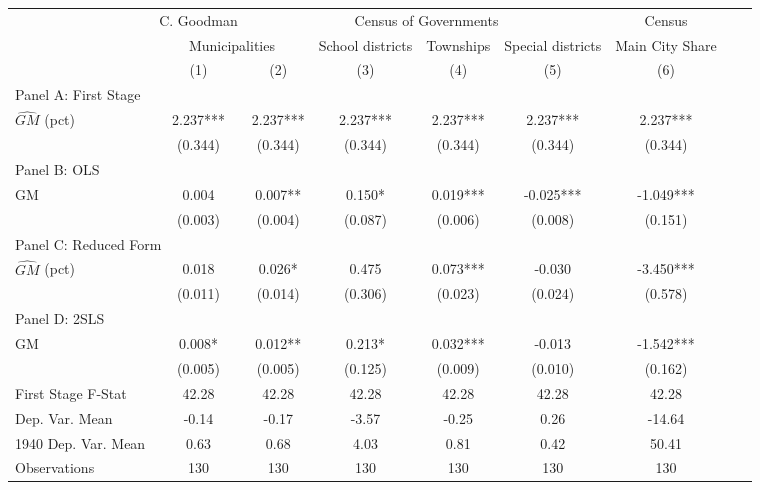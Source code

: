  \begin{tabular}{l*{8}{c}} \toprule
&\multicolumn{1}{c}{C. Goodman}&\multicolumn{4}{c}{Census of Governments}&\multicolumn{1}{c}{Census}\\\cmidrule(lr){2-2}\cmidrule(lr){3-6}\cmidrule(lr){7-7}
&\multicolumn{2}{c}{Municipalities}&\multicolumn{1}{c}{School districts}&\multicolumn{1}{c}{Townships}&\multicolumn{1}{c}{Special districts}&\multicolumn{1}{c}{Main City Share}\\\cmidrule(lr){2-3}\cmidrule(lr){4-6}\cmidrule(lr){7-7}
&\multicolumn{1}{c}{(1)}&\multicolumn{1}{c}{(2)}&\multicolumn{1}{c}{(3)}&\multicolumn{1}{c}{(4)}&\multicolumn{1}{c}{(5)}&\multicolumn{1}{c}{(6)}\\
\cmidrule(lr){1-7}
\multicolumn{6}{l}{Panel A: First Stage}\\
\cmidrule(lr){1-7}
$\widehat{GM}$ (pct)&    2.237***&    2.237***&    2.237***&    2.237***&    2.237***&    2.237***\\
                &  (0.344)   &  (0.344)   &  (0.344)   &  (0.344)   &  (0.344)   &  (0.344)   \\
\cmidrule(lr){1-7}
\multicolumn{6}{l}{Panel B: OLS}\\
\cmidrule(lr){1-7}
GM              &    0.004   &    0.007** &    0.150*  &    0.019***&   -0.025***&   -1.049***\\
                &  (0.003)   &  (0.004)   &  (0.087)   &  (0.006)   &  (0.008)   &  (0.151)   \\
\cmidrule(lr){1-7}
\multicolumn{6}{l}{Panel C: Reduced Form}\\
\cmidrule(lr){1-7}
$\widehat{GM}$ (pct)&    0.018   &    0.026*  &    0.475   &    0.073***&   -0.030   &   -3.450***\\
                &  (0.011)   &  (0.014)   &  (0.306)   &  (0.023)   &  (0.024)   &  (0.578)   \\
\cmidrule(lr){1-7}
\multicolumn{6}{l}{Panel D: 2SLS}\\
\cmidrule(lr){1-7}
GM              &    0.008*  &    0.012** &    0.213*  &    0.032***&   -0.013   &   -1.542***\\
                &  (0.005)   &  (0.005)   &  (0.125)   &  (0.009)   &  (0.010)   &  (0.162)   \\
\midrule
First Stage F-Stat&    42.28   &    42.28   &    42.28   &    42.28   &    42.28   &    42.28   \\
Dep. Var. Mean  &    -0.14   &    -0.17   &    -3.57   &    -0.25   &     0.26   &   -14.64   \\
1940 Dep. Var. Mean&     0.63   &     0.68   &     4.03   &     0.81   &     0.42   &    50.41   \\
Observations    &      130   &      130   &      130   &      130   &      130   &      130   \\
 \bottomrule \end{tabular}

